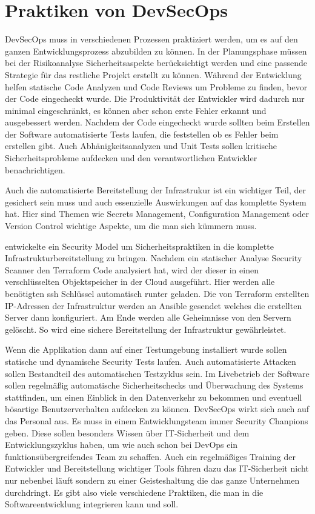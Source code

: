 \section{Praktiken von DevSecOps}
DevSecOps muss in verschiedenen Prozessen praktiziert werden, um es auf den ganzen Entwicklungsprozess abzubilden zu können.
In der Planungsphase müssen bei der Risikoanalyse Sicherheitsaspekte berücksichtigt werden und eine passende Strategie für das restliche Projekt erstellt zu können.
Während der Entwicklung helfen statische Code Analyzen und Code Reviews um Probleme zu finden, bevor der Code eingecheckt wurde. Die Produktivität der Entwickler wird dadurch nur minimal eingeschränkt, es können aber schon erste Fehler erkannt und ausgebessert werden.
Nachdem der Code eingecheckt wurde sollten beim Erstellen der Software automatisierte Tests laufen, die feststellen ob es Fehler beim erstellen gibt. Auch Abhänigkeitsanalyzen und Unit Tests sollen kritische Sicherheitsprobleme aufdecken und den verantwortlichen Entwickler benachrichtigen.

Auch die automatisierte Bereitstellung der Infrastrukur ist ein wichtiger Teil, der gesichert sein muss und auch essenzielle Auswirkungen auf das komplette System hat.
Hier sind Themen wie Secrets Management, Configuration Management oder Version Control wichtige Aspekte, um die man sich kümmern muss.\cite{grey}

\cite{security-model} entwickelte ein Security Model um Sicherheitspraktiken in die komplette Infrastrukturbereitstellung zu bringen. Nachdem ein statischer Analyse Security Scanner den Terraform Code analysiert hat, wird der dieser in einen verschlüsselten Objektspeicher in der Cloud ausgeführt. Hier werden alle benötigten \ac{ssh} Schlüssel automatisch runter geladen. Die von Terraform erstellten IP-Adressen der Infrastruktur werden an Ansible gesendet welches die erstellten Server dann konfiguriert. Am Ende werden alle Geheimnisse von den Servern gelöscht. So wird eine sichere Bereitstellung der Infrastruktur gewährleistet.

Wenn die Applikation dann auf einer Testumgebung installiert wurde sollen statische und dynamische Security Tests laufen. Auch automatisierte Attacken sollen Bestandteil des automatischen Testzyklus sein.
Im Livebetrieb der Software sollen regelmäßig automatische Sicherheitschecks und Überwachung des Systems stattfinden, um einen Einblick in den Datenverkehr zu bekommen und eventuell bösartige Benutzerverhalten aufdecken zu können.
DevSecOps wirkt sich auch auf das Personal aus. Es muss in einem Entwicklungsteam immer \glqq Security Chanpions\grqq \cite{grey} geben. Diese sollen besonders Wissen über IT-Sicherheit und dem Entwicklungszyklus haben, um wie auch schon bei DevOps ein funktionsübergreifendes Team zu schaffen.
Auch ein regelmäßiges Training der Entwickler und Bereitstellung wichtiger Tools führen dazu das IT-Sicherheit nicht nur nebenbei läuft sondern zu einer Geisteshaltung die das ganze Unternehmen durchdringt.
Es gibt also viele verschiedene Praktiken, die man in die Softwareentwicklung integrieren kann und soll.

